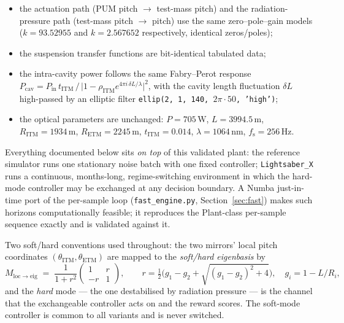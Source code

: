 \documentclass[11pt,a4paper]{article}
\newcommand{\SI}[2]{#1\,\text{#2}}
\newcommand{\code}[1]{\texttt{#1}}
\newcommand{\fs}{f_{\mathrm{s}}}
\begin{document}
\begin{itemize}
  \item the actuation path (PUM pitch $\to$ test-mass pitch) and the radiation-pressure
        path (test-mass pitch $\to$ pitch) use the same zero--pole--gain models
        ($k=93.52955$ and $k=2.567652$ respectively, identical zeros/poles);
  \item the suspension transfer functions are bit-identical tabulated data;
  \item the intra-cavity power follows the same Fabry--Perot response
        $P_{\mathrm{cav}} = P_{\mathrm{in}}\, t_{\mathrm{ITM}} \, \big/\,
        \lvert 1-\rho_{\mathrm{ITM}} e^{4\pi i\, \delta L/\lambda}\rvert^{2}$,
        with the cavity length fluctuation $\delta L$ high-passed by an elliptic filter
        \code{ellip(2,\,1,\,140,\,$2\pi\cdot50$,\,'high')};
  \item the optical parameters are unchanged: $P=\SI{705}{W}$, $L=\SI{3994.5}{m}$,
        $R_{\mathrm{ITM}}=\SI{1934}{m}$, $R_{\mathrm{ETM}}=\SI{2245}{m}$,
        $t_{\mathrm{ITM}}=0.014$, $\lambda=\SI{1064}{nm}$, $\fs=\SI{256}{Hz}$.
\end{itemize}

Everything documented below sits \emph{on top} of this validated plant: the reference
simulator runs one stationary noise batch with one fixed controller; \code{Lightsaber\_X}
runs a continuous, months-long, regime-switching environment in which the hard-mode
controller may be exchanged at any decision boundary. A Numba just-in-time port of the
per-sample loop (\code{fast\_engine.py}, Section~\ref{sec:fast}) makes such horizons
computationally feasible; it reproduces the Plant-class per-sample sequence exactly and
is validated against it.

Two soft/hard conventions used throughout: the two mirrors' local pitch coordinates
$(\theta_{\mathrm{ITM}},\theta_{\mathrm{ETM}})$ are mapped to the \emph{soft/hard
eigenbasis} by
\begin{equation}
  \label{eq:eig}
  M_{\mathrm{loc}\to\mathrm{eig}} \;=\; \frac{1}{1+r^{2}}
  \begin{pmatrix} 1 & r\\ -r & 1 \end{pmatrix},
  \qquad
  r=\tfrac12\Big(g_1-g_2+\sqrt{(g_1-g_2)^{2}+4}\Big),
  \quad g_i = 1 - L/R_i ,
\end{equation}
and the \emph{hard} mode --- the one destabilised by radiation pressure --- is the
channel that the exchangeable controller acts on and the reward scores. The soft-mode
controller is common to all variants and is never switched.
\end{document}
